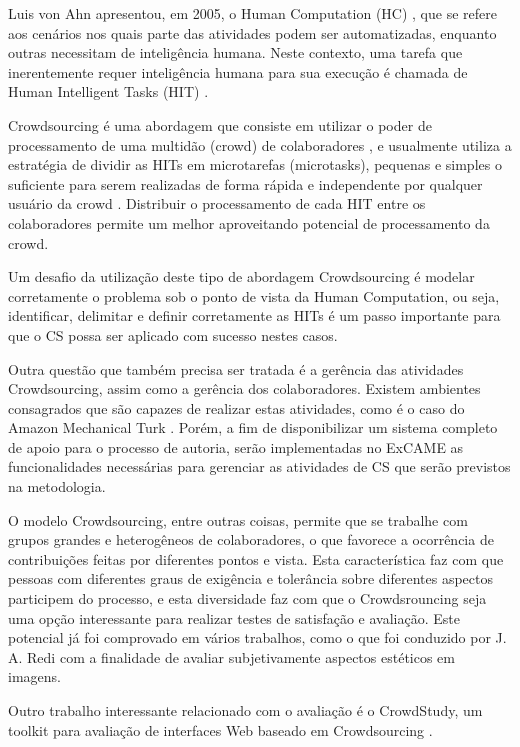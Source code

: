 \documentclass{sig-alternate}
\begin{document}
Luis von Ahn apresentou, em 2005, o Human Computation (HC) \cite{VonAhn:2005:HC:1168246}, que se refere aos cenários nos quais parte das atividades podem ser automatizadas, enquanto outras necessitam de inteligência humana. Neste contexto, uma tarefa que inerentemente requer inteligência humana para sua execução é chamada de Human Intelligent Tasks (HIT) \cite{Mo:2013:OPH:2505515.2505755}.

 

Crowdsourcing é uma abordagem que consiste em utilizar o poder de processamento de uma multidão (crowd) de colaboradores \cite{Howe2006}, e usualmente utiliza a estratégia de dividir as HITs em microtarefas (microtasks), pequenas e simples o suficiente para serem realizadas de forma rápida e independente por qualquer usuário da crowd \cite{Difallah:2015:DMC:2736277.2741685}. Distribuir o processamento de cada HIT entre os colaboradores permite um melhor aproveitando potencial de processamento da crowd.


Um desafio da utilização deste tipo de abordagem Crowdsourcing é modelar corretamente o problema sob o ponto de vista da Human Computation, ou seja, identificar, delimitar e definir corretamente as HITs é um passo importante para que o CS possa ser aplicado com sucesso nestes casos.


Outra questão que também precisa ser tratada é a gerência das atividades Crowdsourcing, assim como a gerência dos colaboradores. Existem ambientes consagrados que são capazes de realizar estas atividades, como é o caso do Amazon Mechanical Turk \cite{Difallah:2015:DMC:2736277.2741685}. Porém, a fim de disponibilizar um sistema completo de apoio para o processo de autoria, serão implementadas no ExCAME as funcionalidades necessárias para gerenciar as atividades de CS que serão previstos na metodologia.


O modelo Crowdsourcing, entre outras coisas, permite que se trabalhe com grupos grandes e heterogêneos de colaboradores, o que favorece a ocorrência de contribuições feitas por diferentes pontos e vista. Esta característica faz com que pessoas com diferentes graus de exigência e tolerância sobre diferentes aspectos participem do processo, e esta diversidade faz com que o Crowdsrouncing seja uma opção interessante para realizar testes de satisfação e avaliação. Este potencial já foi comprovado em vários trabalhos, como o que foi conduzido por J. A. Redi \cite{Redi2013} com a finalidade de avaliar subjetivamente aspectos estéticos em imagens.

Outro trabalho interessante relacionado com o avaliação é o CrowdStudy, um toolkit para avaliação de interfaces Web baseado em Crowdsourcing \cite{Nebeling}.
\end{document}
